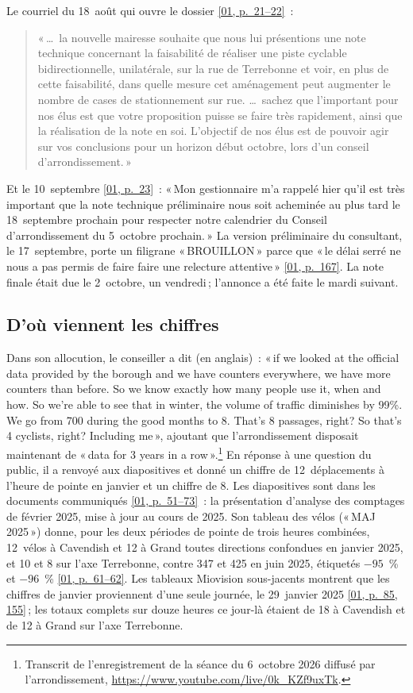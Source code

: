\documentclass[11pt,letterpaper]{article}
\newcommand{\pagesurl}{https://openmobilitydata.github.io/Terrebonne-access-requests}
\newcommand{\pgl}[3]{\href{\pagesurl/\csname bundle#1\endcsname\#page=#2}{\textsf{\small[#1, p.~#3]}}}
\newcommand{\pg}[2]{\pgl{#1}{#2}{#2}}
\newcommand{\quot}[1]{\begin{quote}\small #1\end{quote}}
\begin{document}
Le courriel du 18~août qui ouvre le dossier \pgl{01}{21}{21--22}~:

\quot{«\,\ldots\ la nouvelle mairesse souhaite que nous lui présentions une note
technique concernant la faisabilité de réaliser une piste cyclable
bidirectionnelle, unilatérale, sur la rue de Terrebonne et voir, en plus de
cette faisabilité, dans quelle mesure cet aménagement peut augmenter le
nombre de cases de stationnement sur rue. \ldots\ sachez que l'important
pour nos élus est que votre proposition puisse se faire très rapidement,
ainsi que la réalisation de la note en soi. L'objectif de nos élus est de
pouvoir agir sur vos conclusions pour un horizon début octobre, lors d'un
conseil d'arrondissement.\,»}

Et le 10~septembre \pg{01}{23}~: «\,Mon gestionnaire m'a rappelé hier qu'il
est très important que la note technique préliminaire nous soit acheminée
au plus tard le 18~septembre prochain pour respecter notre calendrier du
Conseil d'arrondissement du 5~octobre prochain.\,» La version préliminaire
du consultant, le 17~septembre, porte un filigrane «\,BROUILLON\,» parce que
«\,le délai serré ne nous a pas permis de faire faire une relecture
attentive\,» \pg{01}{167}. La note finale était due le 2~octobre, un
vendredi\,; l'annonce a été faite le mardi suivant.

\subsection{D'où viennent les chiffres}

Dans son allocution, le conseiller a dit (en anglais)~: «\,if we looked at
the official data provided by the borough and we have counters everywhere,
we have more counters than before. So we know exactly how many people use
it, when and how. So we're able to see that in winter, the volume of
traffic diminishes by 99\%. We go from 700 during the good months to 8.
That's 8 passages, right? So that's 4 cyclists, right? Including me\,»,
ajoutant que l'arrondissement disposait maintenant de «\,data for 3 years
in a row\,».\footnote{Transcrit de l'enregistrement de la séance du
6~octobre 2026 diffusé par l'arrondissement,
\url{https://www.youtube.com/live/0k_KZf9uxTk}.} En réponse à une question
du public, il a renvoyé aux diapositives et donné un chiffre de
12~déplacements à l'heure de pointe en janvier et un chiffre de 8. Les
diapositives sont dans les documents communiqués \pgl{01}{51}{51--73}~: la
présentation d'analyse des comptages de février 2025, mise à jour au cours
de 2025. Son tableau des vélos («\,MAJ 2025\,») donne, pour les deux périodes
de pointe de trois heures combinées, 12~vélos à Cavendish et 12 à Grand
toutes directions confondues en janvier 2025, et 10 et 8 sur l'axe
Terrebonne, contre 347 et 425 en juin 2025, étiquetés $-95$~\% et
$-96$~\% \pgl{01}{61}{61--62}. Les tableaux Miovision sous-jacents montrent
que les chiffres de janvier proviennent d'une seule journée, le 29~janvier
2025 \pgl{01}{85}{85, 155}\,; les totaux complets sur douze heures ce
jour-là étaient de 18 à Cavendish et de 12 à Grand sur l'axe Terrebonne.
\end{document}
